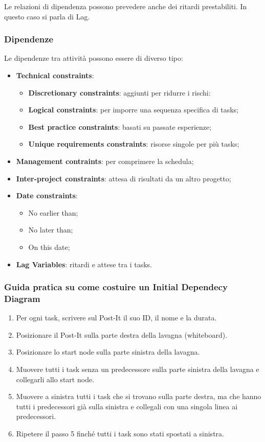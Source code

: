 \noindent Le relazioni di dipendenza possono prevedere anche dei ritardi prestabiliti. In questo caso si parla di Lag.

\subsubsection{Dipendenze}
Le dipendenze tra attività possono essere di diverso tipo:
\begin{itemize}
	\item \textbf{Technical constraints}:
	\begin{itemize}
		\item \textbf{Discretionary constraints}: aggiunti per ridurre i rischi:
		\item \textbf{Logical constraints}: per imporre una sequenza specifica di tasks;
		\item \textbf{Best practice constraints}: basati su passate esperienze;
		\item \textbf{Unique requirements constraints}: risorse singole per più tasks;
	\end{itemize}
	\item \textbf{Management contraints}: per comprimere la schedula;
	\item \textbf{Inter-project constraints}: attesa di risultati da un altro progetto;
	\item \textbf{Date constraints}:
	\begin{itemize}
		\item No earlier than;
		\item No later than;
		\item On this date;
	\end{itemize}
	\item \textbf{Lag Variables}: ritardi e attese tra i tasks.
\end{itemize}
\subsubsection{Guida pratica su come costuire un Initial Dependecy Diagram}
\begin{enumerate}
	\item Per ogni task, scrivere sul Post-It il suo ID, il nome e la durata.
	\item Posizionare il Post-It sulla parte destra della lavagna (whiteboard).
	\item Posizionare lo start node sulla parte sinistra della lavagna.
	\item Muovere tutti i task senza un predecessore sulla parte sinistra della
	lavagna e collegarli allo start node.
	\item Muovere a sinistra tutti i task che si trovano sulla parte destra, ma che
	hanno tutti i predecessori già sulla sinistra e collegali con una singola
	linea ai predecessori.
	\item Ripetere il passo 5 finché tutti i task sono stati spostati a sinistra.
\end{enumerate}
